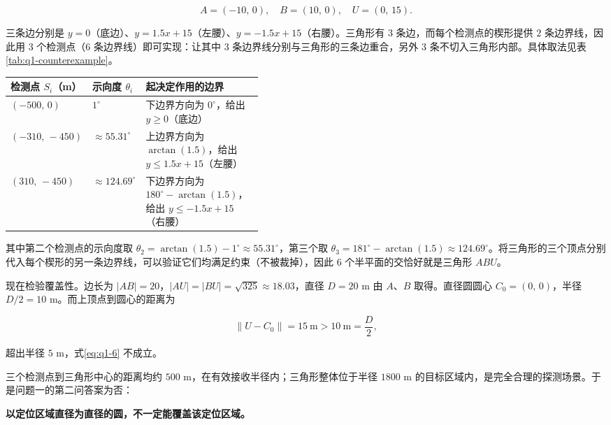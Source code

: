\[
A=(-10,\,0),\quad B=(10,\,0),\quad U=(0,\,15).
\]

三条边分别是 $y=0$（底边）、$y=1.5x+15$（左腰）、$y=-1.5x+15$（右腰）。三角形有 $3$ 条边，而每个检测点的楔形提供 $2$ 条边界线，因此用 $3$ 个检测点（$6$ 条边界线）即可实现：让其中 $3$ 条边界线分别与三角形的三条边重合，另外 $3$ 条不切入三角形内部。具体取法见表\ref{tab:q1-counterexample}。

\begin{center}
\begin{minipage}{\linewidth}
\centering
{}\label{tab:q1-counterexample}

\renewcommand{\arraystretch}{1.3}
\begin{tabularx}{0.98\linewidth}{>{\centering\arraybackslash}p{0.22\linewidth}>{\centering\arraybackslash}p{0.20\linewidth}>{\raggedright\arraybackslash}X}
\toprule
\textbf{检测点 $S_i$（m）} & \textbf{示向度 $\theta_i$} & \textbf{起决定作用的边界} \\
\midrule
$(-500,\,0)$ & $1^\circ$ & 下边界方向为 $0^\circ$，给出 $y\ge0$（底边） \\
$(-310,\,-450)$ & $\approx55.31^\circ$ & 上边界方向为 $\arctan(1.5)$，给出 $y\le1.5x+15$（左腰） \\
$(310,\,-450)$ & $\approx124.69^\circ$ & 下边界方向为 $180^\circ-\arctan(1.5)$，给出 $y\le-1.5x+15$（右腰） \\
\bottomrule
\end{tabularx}
\end{minipage}
\end{center}

其中第二个检测点的示向度取 $\theta_2=\arctan(1.5)-1^\circ\approx55.31^\circ$，第三个取 $\theta_3=181^\circ-\arctan(1.5)\approx124.69^\circ$。将三角形的三个顶点分别代入每个楔形的另一条边界线，可以验证它们均满足约束（不被裁掉），因此 $6$ 个半平面的交恰好就是三角形 $ABU$。

现在检验覆盖性。边长为 $|AB|=20$，$|AU|=|BU|=\sqrt{325}\approx18.03$，直径 $D=20$ m 由 $A$、$B$ 取得。直径圆圆心 $C_0=(0,\,0)$，半径 $D/2=10$ m。而上顶点到圆心的距离为

\[
\|U-C_0\|=15\ \text{m}>10\ \text{m}=\frac D2,
\]

超出半径 $5$ m，式\eqref{eq:q1-6} 不成立。

\begin{center}
\begin{minipage}{\linewidth}
\centering
\QOneCaseFigure
{}
\label{fig:q1-counterexample}
\end{minipage}
\end{center}

三个检测点到三角形中心的距离均约 $500$ m，在有效接收半径内；三角形整体位于半径 $1800$ m 的目标区域内，是完全合理的探测场景。于是问题一的第二问答案为否：

\textbf{以定位区域直径为直径的圆，不一定能覆盖该定位区域。}
